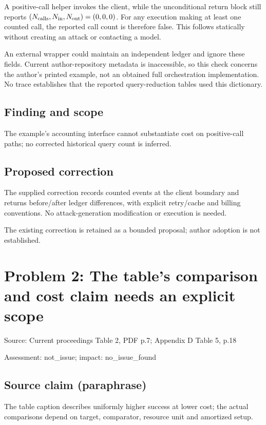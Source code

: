\documentclass[11pt]{article}
\begin{document}
A positive-call helper invokes the client, while the unconditional return block still reports \((N_{\rm calls},N_{\rm in},N_{\rm out})=(0,0,0)\). For any execution making at least one counted call, the reported call count is therefore false. This follows statically without creating an attack or contacting a model.

An external wrapper could maintain an independent ledger and ignore these fields. Current author-repository metadata is inaccessible, so this check concerns the author’s printed example, not an obtained full orchestration implementation. No trace establishes that the reported query-reduction tables used this dictionary.

\subsection*{Finding and scope}

The example’s accounting interface cannot substantiate cost on positive-call paths; no corrected historical query count is inferred.

\subsection*{Proposed correction}

The supplied correction records counted events at the client boundary and returns before/after ledger differences, with explicit retry/cache and billing conventions. No attack-generation modification or execution is needed.

The existing correction is retained as a bounded proposal; author adoption is not established.

\section*{Problem 2: The table’s comparison and cost claim needs an explicit scope}

Source: Current proceedings Table 2, PDF p.7; Appendix D Table 5, p.18

Assessment: not\_issue; impact: no\_issue\_found

\subsection*{Source claim (paraphrase)}

The table caption describes uniformly higher success at lower cost; the actual comparisons depend on target, comparator, resource unit and amortized setup.
\end{document}
